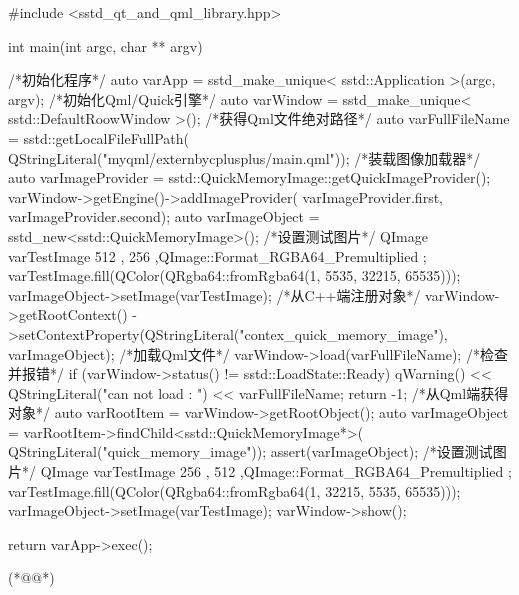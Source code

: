 \label{f000082}    %
\FloatBarrier                                  %
\begin{thebookfilesourceone}[escapeinside={(*@}{@*)},
caption=GoodLuck,
title=\filesourcenumbernameone \thefilesourcenumber
]
#include <sstd_qt_and_qml_library.hpp>

int main(int argc, char ** argv) {

    /*初始化程序*/
    auto varApp = sstd_make_unique< sstd::Application >(argc, argv);
    /*初始化Qml/Quick引擎*/
    auto varWindow = sstd_make_unique< sstd::DefaultRoowWindow >();
    {
        /*获得Qml文件绝对路径*/
        auto varFullFileName = sstd::getLocalFileFullPath(
            QStringLiteral("myqml/externbycplusplus/main.qml"));
        {
            /*装载图像加载器*/
            auto varImageProvider = sstd::QuickMemoryImage::getQuickImageProvider();
            varWindow->getEngine()->addImageProvider(
                varImageProvider.first, varImageProvider.second);
        }
        {
            auto varImageObject = sstd_new<sstd::QuickMemoryImage>();
            /*设置测试图片*/
            QImage varTestImage{ 512 , 256 ,QImage::Format_RGBA64_Premultiplied };
            varTestImage.fill(QColor(QRgba64::fromRgba64(1, 5535, 32215, 65535)));
            varImageObject->setImage(varTestImage);
            /*从C++端注册对象*/
            varWindow->getRootContext()
                ->setContextProperty(QStringLiteral("contex_quick_memory_image"), varImageObject);
        }
        /*加载Qml文件*/
        varWindow->load(varFullFileName);
        /*检查并报错*/
        if (varWindow->status() != sstd::LoadState::Ready) {
            qWarning() << QStringLiteral("can not load : ") << varFullFileName;
            return -1;
        }
        {
            /*从Qml端获得对象*/
            auto varRootItem = varWindow->getRootObject();
            auto varImageObject = varRootItem->findChild<sstd::QuickMemoryImage*>(
                QStringLiteral("quick_memory_image"));
            assert(varImageObject);
            /*设置测试图片*/
            QImage varTestImage{ 256 , 512 ,QImage::Format_RGBA64_Premultiplied };
            varTestImage.fill(QColor(QRgba64::fromRgba64(1, 32215, 5535, 65535)));
            varImageObject->setImage(varTestImage);
        }
    }
    varWindow->show();

    return varApp->exec();

}(*@\marginpar[\hfill\setlength\fboxsep{2pt}\fbox{\footnotesize{\kaishu\parbox{1em}{\setlength{\baselineskip}{2pt}\filesourcenumbernameone}}\footnotesize{\thefilesourcenumber}}]{\setlength\fboxsep{2pt}\fbox{\footnotesize{\kaishu\parbox{1em}{\setlength{\baselineskip}{2pt}\filesourcenumbernameone}}\footnotesize{\thefilesourcenumber}}}@*)\end{thebookfilesourceone}          %
\addtocounter{lstlisting}{-1}   %


